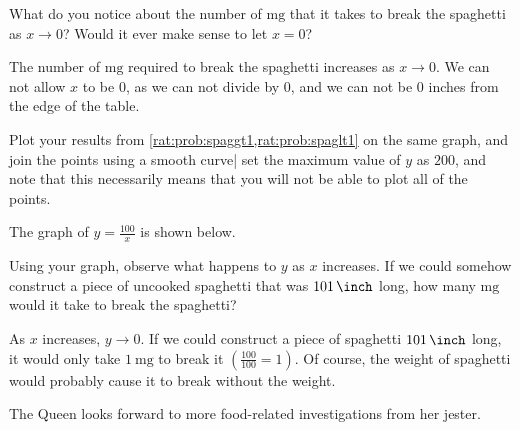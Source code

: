 \begin{problem}
\begin{subproblem}
\end{subproblem}
\begin{subproblem}
	What do you notice about the number of $\si{\milli\gram}$ that it takes to break the spaghetti
	as $x\rightarrow 0$? Would it ever make sense to let $x=0$?
	\begin{shortsolution}
		The number of $\si{\milli\gram}$ required to break the spaghetti increases as $x\rightarrow 0$.
		We can not allow $x$ to be $0$, as we can not divide by $0$, and we can not 
		be $0$ inches from the edge of the table.
	\end{shortsolution}
\end{subproblem}
\begin{subproblem}
	Plot your results from \cref{rat:prob:spaggt1,rat:prob:spaglt1} on the same graph, 
	and join the points using a smooth curve| set the maximum value of $y$ as $200$, and 
	note that this necessarily means that you will not be able to plot all of the points.
	\begin{shortsolution}
		The graph of $y=\frac{100}{x}$ is shown below.
				
	\end{shortsolution}
\end{subproblem}
\begin{subproblem}
	Using your graph, observe what happens to $y$ as $x$ increases. If we could somehow
	construct a piece of uncooked spaghetti that was $\SI{101}{\inch}$ long, how many 
	$\si{\milli\gram}$ would it take to break the spaghetti?
	\begin{shortsolution}
		As $x$ increases, $y\rightarrow 0$. If we could construct a piece of spaghetti 
		$\SI{101}{\inch}$ long, it would only take $\SI{1}{\milli\gram}$ to break it $\left(\frac{100}{100}=1\right)$. Of course, 
		the weight of spaghetti would probably cause it to break without the weight.
	\end{shortsolution}
\end{subproblem}
The Queen looks forward to more food-related investigations from her jester.
\end{problem}



